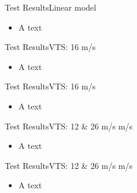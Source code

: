 \begin{frame}{Test Results}{Linear model}
	\begin{itemize}
		\item A text
	\end{itemize}
\end{frame}


\begin{frame}{Test Results}{VTS: 16 m/s}
	\begin{itemize}
		\item A text
	\end{itemize}\bigskip
\end{frame}



\begin{frame}{Test Results}{VTS: 16 m/s}
	\begin{itemize}
		\item A text
	\end{itemize}\bigskip
\end{frame}



\begin{frame}{Test Results}{VTS: 12 \& 26 m/s m/s}
	\begin{itemize}
		\item A text
	\end{itemize}\bigskip
\end{frame}



\begin{frame}{Test Results}{VTS: 12 \& 26 m/s m/s}
	\begin{itemize}
		\item A text
	\end{itemize}\bigskip
\end{frame}